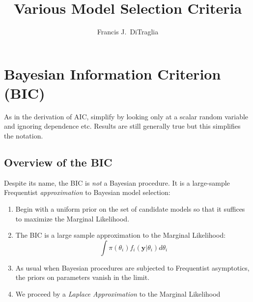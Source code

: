 \documentclass[12pt]{article}
\theoremstyle{definition}
\begin{document}
\title{Various Model Selection Criteria}

\author{Francis J.\ DiTraglia}

\maketitle 

\section{Bayesian Information Criterion (BIC)}
As in the derivation of AIC, simplify by looking only at a scalar random variable and ignoring dependence etc. Results are still generally true but this simplifies the notation.

\subsection{Overview of the BIC}
Despite its name, the BIC is \emph{not} a Bayesian procedure. It is a large-sample Frequentist \emph{approximation} to Bayesian model selection:
	\begin{enumerate}
		\item Begin with a uniform prior on the set of candidate models so that it suffices to maximize the Marginal Likelihood.
		\item The BIC is a large sample approximation to the Marginal Likelihood:
		$$\int \pi(\theta_i)f_i(\mathbf{y}|\theta_i)d\theta_i$$
		\item As usual when Bayesian procedures are subjected to Frequentist asymptotics, the priors on parameters vanish in the limit.
		\item We proceed by a \emph{Laplace Approximation} to the Marginal Likelihood
	\end{enumerate}
\end{document}
